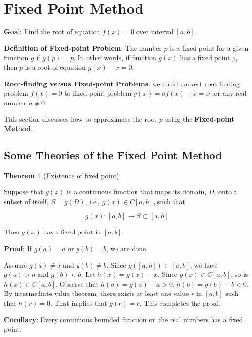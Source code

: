 \documentclass[
]{book}
\begin{document}
\hypertarget{fixed-point-method}{%
\chapter{Fixed Point Method}\label{fixed-point-method}}

\hfill\break

\textbf{Goal}: Find the root of equation \(f(x) = 0\) over interval \([a, b]\).

\hfill\break

\textbf{Definition of Fixed-point Problem}: The number \(p\) is a fixed point for a given function \(g\) if \(g( p) = p\). In other words, if function \(g(x)\) has a fixed point \(p\), then \(p\) is a root of equation \(g(x) - x = 0\).

\textbf{Root-finding versus Fixed-point Problems}: we could convert root finding problem \(f(x) = 0\) to fixed-point problem \(g(x) = af(x) + x = x\) for any real number \(a \ne 0\).

This section discusses how to approximate the root \(p\) using the \textbf{Fixed-point Method}.

\hypertarget{some-theories-of-the-fixed-point-method}{%
\section{Some Theories of the Fixed Point Method}\label{some-theories-of-the-fixed-point-method}}

\textbf{Theorem 1} (Existence of fixed point)

Suppose that \(g(x)\) is a continuous function that maps its domain, \(D\), onto a subset of itself, \(S = g(D)\), i.e., \(g(x) \in C[a, b]\), such that

\[
g(x): [a,b]\to S \subset [a, b]
\]

Then \(g(x)\) has a fixed point in \([a, b]\).

\textbf{Proof}: If \(g(a) = a\) or \(g(b) = b\), we are done.

Assume \(g(a) \ne a\) and \(g(b) \ne b\). Since \(g([a,b]) \subset [a, b]\), we have \(g(a) > a\) and \(g(b) < b\). Let \(h(x) = g(x) - x\). Since \(g(x) \in C[a, b]\), so is \(h(x) \in C[a, b]\). Observe that \(h(a) = g(a) - a > 0\), \(h(b) = g(b) - b < 0\). By intermediate value theorem, there exists at least one value \(r\) in \([a, b]\) such that \(h(r) = 0\). That implies that \(g(r) = r\). This completes the proof.

\textbf{Corollary}: Every continuous bounded function on the real numbers has a fixed point.
\end{document}
